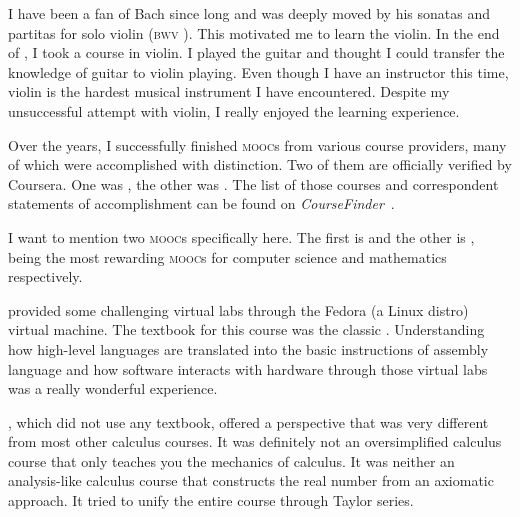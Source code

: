 	I have been a fan of Bach since long and was deeply moved by his sonatas and
	partitas for solo violin (\textsc{bwv} ). This motivated me to
	learn the violin. In the end of , I took a course in violin. I
	played the guitar and thought I could transfer the knowledge of guitar to
	violin playing. Even though I have an instructor this time, violin is the
	hardest musical instrument I have encountered. Despite my unsuccessful attempt
	with violin, I really enjoyed the learning experience.
	
	Over the years, I successfully finished  \textsc{mooc}s from various
	course providers, many of which were accomplished with distinction. Two of them
	are officially verified by Coursera. One was , the other
	was . The list of those  courses and correspondent
	statements of accomplishment can be found on
	\textit{CourseFinder}~\cite{accredible}.
	
	I want to mention two \textsc{mooc}s specifically here. The first is
	 and the other is , being the most rewarding
	\textsc{mooc}s for computer science and mathematics respectively.
	
	 provided some challenging virtual labs through the Fedora (a
	Linux distro) virtual machine. The textbook for this course was the classic
	\textcite{CSAPP}. Understanding how high-level languages are translated
	into the basic instructions of assembly language and how software interacts
	with hardware through those virtual labs was a really wonderful experience.

	, which did not use any textbook, offered a perspective that was
	very different from most other calculus courses. It was definitely not an
	oversimplified calculus course that only teaches you the mechanics of calculus.
	It was neither an analysis-like calculus course that constructs the real number
	from an axiomatic approach. It tried to unify the entire course through Taylor
	series.
	
